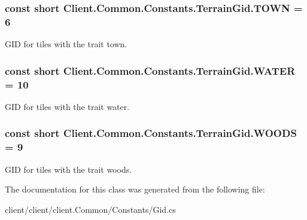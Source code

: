 \subsubsection[{T\+O\+W\+N}]{\setlength{\rightskip}{0pt plus 5cm}const short Client.\+Common.\+Constants.\+Terrain\+Gid.\+T\+O\+W\+N = 6}\label{classClient_1_1Common_1_1Constants_1_1TerrainGid_a580b92e0569e5db71aa6782f545cf99b}


G\+I\+D for tiles with the trait town. 

\hypertarget{classClient_1_1Common_1_1Constants_1_1TerrainGid_a9f9c778def977a1635f05acc03764a8c}{}
\subsubsection[{W\+A\+T\+E\+R}]{\setlength{\rightskip}{0pt plus 5cm}const short Client.\+Common.\+Constants.\+Terrain\+Gid.\+W\+A\+T\+E\+R = 10}\label{classClient_1_1Common_1_1Constants_1_1TerrainGid_a9f9c778def977a1635f05acc03764a8c}


G\+I\+D for tiles with the trait water. 

\hypertarget{classClient_1_1Common_1_1Constants_1_1TerrainGid_ae14b3f7ff6960d5c57bc39b69adbe47d}{}
\subsubsection[{W\+O\+O\+D\+S}]{\setlength{\rightskip}{0pt plus 5cm}const short Client.\+Common.\+Constants.\+Terrain\+Gid.\+W\+O\+O\+D\+S = 9}\label{classClient_1_1Common_1_1Constants_1_1TerrainGid_ae14b3f7ff6960d5c57bc39b69adbe47d}


G\+I\+D for tiles with the trait woods. 



The documentation for this class was generated from the following file\+:\begin{DoxyCompactItemize}
\item 
client/client/client.\+Common/\+Constants/Gid.\+cs\end{DoxyCompactItemize}
